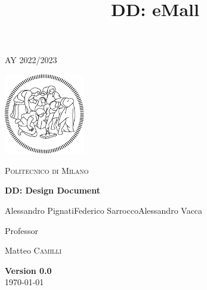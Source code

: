 \documentclass{article}
\title{\textbf{DD: eMall}}
\begin{document}
\begin{titlepage}
    \centering
    {\scshape\large AY 2022/2023 \par}
    \vfill
    \includegraphics[width=100pt]{img/logo-polimi-new}\par\vspace{1cm}
    {\scshape\LARGE Politecnico di Milano \par}
    \vspace{1.5cm}
    {\huge\bfseries DD\@: Design Document \par}
    \vspace{2cm}
    {\large {Alessandro Pignati\quad Federico Sarrocco\quad Alessandro Vacca}\par}
    \vfill
    {\large Professor\par
        Matteo \textsc{Camilli}}
    \vfill
    {\large \textbf{Version 0.0}\\ \today \par}
\end{titlepage}
\clearpage
\tableofcontents
{}
\clearpage
{}







\end{document}
